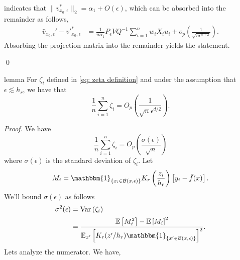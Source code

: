 \documentclass[11pt]{article}
\begin{document}
 indicates that $\|v^*_{x_0, \epsilon}\|_2 = \alpha_1 + O(\epsilon)$, which can be absorbed into the remainder as follows,
\begin{align}
    \hat{v}_{x_0, \epsilon}' - v'^*_{x_0, \epsilon} &= \frac{1}{n\alpha_1}P_{\epsilon}VQ^{-1}\sum_{i = 1}^nw_iX_iu_i +o_p\left(\frac{1}{\sqrt{n\epsilon^{d+2}}}\right).
\end{align}
Absorbing the projection matrix into the remainder yields the statement.

\qed{}

\begin{restatable}{lemma}{} \label{lemma: zeta}
    For $\zeta_i$ defined in \cref{eq: zeta definition} and under the assumption that $\epsilon \lesssim h_r$, we have that 
    \begin{equation}
        \frac{1}{n}\sum_{i = 1}^n\zeta_i = O_p\left(\frac{1}{\sqrt{n}\epsilon^{d/2}}\right).
    \end{equation}
\end{restatable}
\noindent \textit{Proof.} We have
\[\frac{1}{n}\sum_{i = 1}^n\zeta_i = O_p\left(\frac{\sigma(\epsilon)}{\sqrt{n}}\right)\]
where $\sigma(\epsilon)$ is the standard deviation of $\zeta_i$. Let 
\begin{equation}
    M_i = \mathbbm{1}_{\{x_i \in \mathcal{B}(x, \epsilon)\}}K_r\left(\frac{z_i}{h_r}\right)\left[y_i - \bar{f}(x)\right].
\end{equation}
We'll bound $\sigma(\epsilon)$ as follows
\begin{align}
    \sigma^2(\epsilon) &= \text{Var}\left(\zeta_i\right) \\
    &= \frac{\mathbb{E}\left[M_i^2\right] - \mathbb{E}\left[M_i\right]^2}{\mathbb{E}_{x'}\left[K_r(z'/h_r)\mathbbm{1}_{\{x'\in \mathcal{B}(x, \epsilon)\}}\right]^2}. \label{eq: var decomp}
\end{align}
Lets analyze the numerator. We have,
\end{document}
